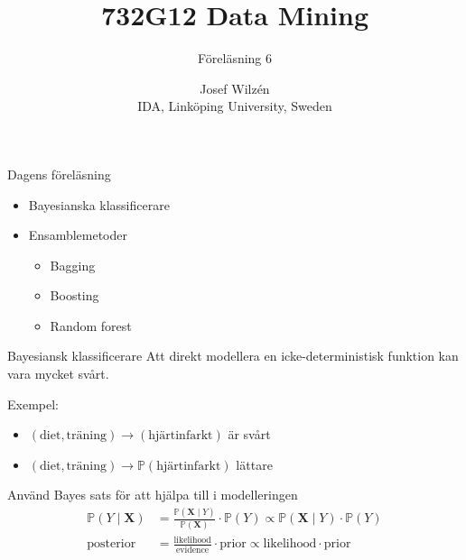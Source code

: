 \documentclass[10pt,english]{beamer}
\title{732G12 Data Mining}
\subtitle{Föreläsning 6}
\date{}
\author{Josef Wilzén \\ IDA, Linköping University, Sweden}
\begin{document}
\maketitle

\begin{frame}{Dagens föreläsning}

    \begin{itemize}
        \item Bayesianska klassificerare
        \item Ensamblemetoder
        \begin{itemize}
            \item Bagging
            \item Boosting
            \item Random forest
        \end{itemize}
    \end{itemize}
    
\end{frame}



\begin{frame}{Bayesiansk klassificerare}
    Att direkt modellera en icke-deterministisk funktion kan vara mycket svårt.

    Exempel:
    \begin{itemize}
        \item $(\text{diet}, \text{träning}) \to (\text{hjärtinfarkt})$ är svårt
        \item $(\text{diet}, \text{träning}) \to \mathbb{P}(\text{hjärtinfarkt})$ lättare
    \end{itemize}

    Använd Bayes sats för att hjälpa till i modelleringen
    \begin{align*}
        \mathbb{P}(Y \mid \mathbf{X}) &= \frac{\mathbb{P}(\mathbf{X} \mid Y)}{\mathbb{P}(\mathbf{X})} \cdot \mathbb{P}(Y) \propto \mathbb{P}(\mathbf{X} \mid Y) \cdot \mathbb{P}(Y) \\
        \text{posterior} &= \frac{\text{likelihood}}{\text{evidence}} \cdot \text{prior} \propto \text{likelihood} \cdot \text{prior}
    \end{align*}
\end{frame}
\end{document}
